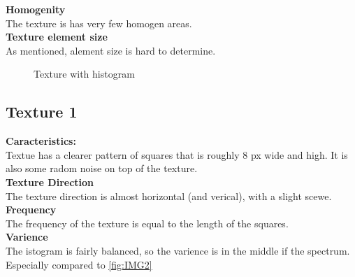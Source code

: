 \documentclass{article}
\begin{document}
\textbf{Homogenity}\\
The texture is has very few homogen areas.\\

\textbf{Texture element size}\\
As mentioned, alement size is hard to determine.

\begin{figure}[h]%
	\centering
    \qquad
    \caption{Texture with histogram}%
    \label{fig:IMG0}%
\end{figure}



\newpage
\subsection{Texture 1}
\textbf{Caracteristics:}\\
Textue has a clearer pattern of squares that is roughly 8 px wide and high.
It is also some radom noise on top of the texture. 
\\

\textbf{Texture Direction}\\
The texture direction is almost horizontal (and verical), with a slight scewe.\\

\textbf{Frequency} \\
The frequency of the texture is equal to the length of the squares.
\\ 


\textbf{Varience}\\
The istogram is fairly balanced, so the varience is in the middle if the spectrum. Especially compared to \ref{fig:IMG2} \\
\end{document}
